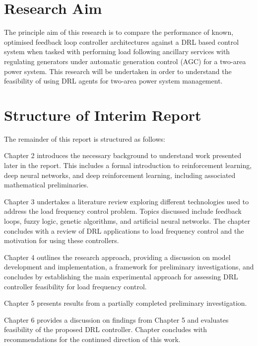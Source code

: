 \section{Research Aim}
The principle aim of this research is to compare the performance of known, optimised feedback loop controller architectures against a DRL based control system when tasked with performing load following ancillary services with regulating generators under automatic generation control (AGC) for a two-area power system. This research will be undertaken in order to understand the feasibility of using DRL agents for two-area power system management.

\section{Structure of Interim Report}
The remainder of this report is structured as follows:

Chapter 2 introduces the necessary background to understand work presented later in the report. This includes a formal introduction to reinforcement learning, deep neural networks, and deep reinforcement learning, including associated mathematical preliminaries.

Chapter 3 undertakes a literature review exploring different technologies used to address the load frequency control problem. Topics discussed include feedback loops, fuzzy logic, genetic algorithms, and artificial neural networks. The chapter concludes with a review of DRL applications to load frequency control and the motivation for using these controllers.

Chapter 4 outlines the research approach, providing a discussion on model development and implementation, a framework for preliminary investigations, and concludes by establishing the main experimental approach for assessing DRL controller feasibility for load frequency control.

Chapter 5 presents results from a partially completed preliminary investigation.

Chapter 6 provides a discussion on findings from Chapter 5 and evaluates feasibility of the proposed DRL controller. Chapter concludes with recommendations for the continued direction of this work.